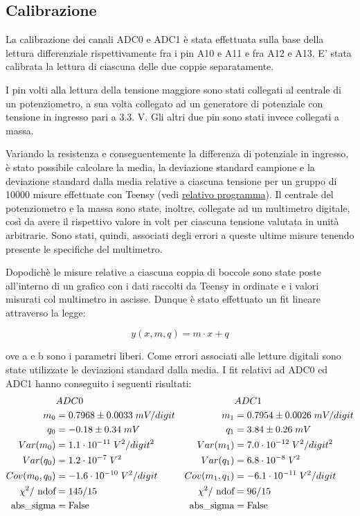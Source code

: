 \documentclass{article}[a4paper, oneside, 11pt]
\begin{document}
\subsection{Calibrazione}

La calibrazione dei canali ADC0 e ADC1 è stata effettuata sulla base della lettura differenziale rispettivamente fra i pin A10 e A11 e fra A12 e A13. E’ stata calibrata la lettura di ciascuna delle due coppie separatamente.

I pin volti alla lettura della tensione maggiore sono stati collegati al centrale di un potenziometro, a sua volta collegato ad un generatore di potenziale con tensione in ingresso pari a 3.3. V. Gli altri due pin sono stati invece collegati a massa.

Variando la resistenza e conseguentemente la differenza di potenziale in ingresso, è stato possibile calcolare la media, la deviazione standard campione e la deviazione standard dalla media relative a ciascuna tensione per un gruppo di 10000 misure effettuate con Teensy (vedi \href{https://github.com/LucaCiucci/relaz_seme/blob/master/sketches/teensy_calib/teensy_calib.ino}{relativo programma}). Il centrale del potenziometro e la massa sono state, inoltre, collegate ad un multimetro digitale, così da avere il rispettivo valore in volt per ciascuna tensione valutata in unità arbitrarie. Sono stati, quindi, associati degli errori a queste ultime misure  tenendo presente le specifiche del multimetro.

Dopodichè le misure relative a ciascuna coppia di boccole sono state poste all’interno di un grafico con i dati raccolti da Teensy in ordinate e i valori misurati col multimetro in ascisse. Dunque è stato effettuato un fit lineare attraverso la legge:

\begin{equation}
y(x, m, q)  = m \cdot x + q
\end{equation}

ove a e b sono i parametri liberi. Come errori associati alle letture digitali sono state utilizzate le deviazioni standard dalla media. I fit relativi ad ADC0 ed ADC1 hanno conseguito i seguenti risultati:
\begin{align*}
	&ADC0	&&ADC1\\
	m_0 &= 0.7968 \pm  0.0033   \; mV/digit	& m_1 &= 0.7954 \pm 0.0026  \; mV/digit \\
	q_0 &= - 0.18 \pm 0.34  \; mV 	&q_1 &= 3.84  \pm 0.26  \; mV \\
	Var(m_0)  &= 1.1 \cdot 10^{-11}  \; V^2 /digit^2	&Var(m_1) &= 7.0 \cdot 10^{-12}  \; V^2 /digit^2 \\
	Var(q_0) &=1.2 \cdot 10^{-7} \; V^2 	&Var(q_1) &= 6.8 \cdot 10^{-8} \; V^2 \\
	Cov(m_0, q_0) &= - 1.6 \cdot 10^{-10} \; V^2  /digit	&Cov(m_1, q_1) &= - 6.1 \cdot 10^{-11} \; V^2  /digit \\
	{\chi}^2/\text{ ndof} &= {145 }/{15}	&{\chi}^2/\text{ ndof} &= {96}/{15}\\ 
	\text{abs\_sigma} &= \rm False	&\text{abs\_sigma} &= \rm False
\end{align*}
\end{document}
